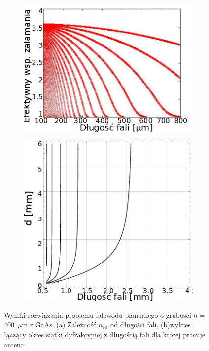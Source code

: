 \begin{figure}
\begin{subfigure}{0.5\textwidth}
        \includegraphics[width=\textwidth]{images/thz/gaas-neffeps.png}
	\caption{}
	\label{fig:gaas-effn}
\end{subfigure}
\begin{subfigure}{0.5\textwidth}
        \includegraphics[width=\textwidth]{images/antenaThz/d_lambda.png}
	\caption{}
	\label{fig:d-lusok}
\end{subfigure}
\caption{Wyniki rozwiązania problemu falowodu planarnego o grubości $h=$400~$\mu$m z GaAs.  (a) Zależność $n_{\textrm{eff}}$ od długości fali, (b)wykres łączący okres siatki dyfrakcyjnej z długością fali dla której pracuje antena. }
\end{figure}



